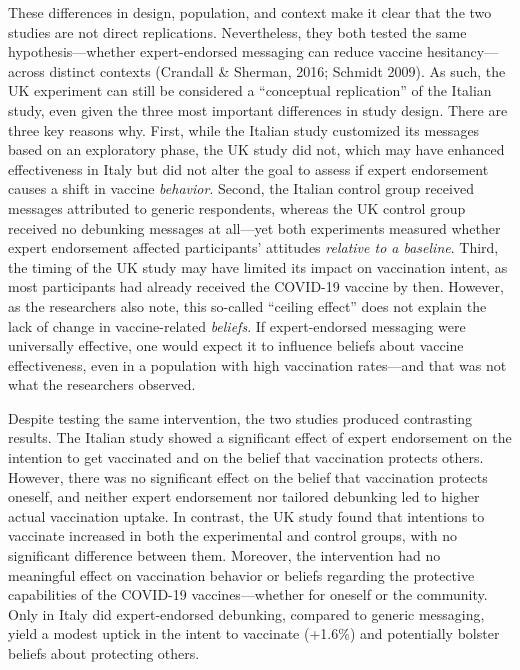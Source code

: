 \documentclass[authordate, reflection]{jote-new-article}
\begin{document}
	These differences in design, population, and context make it clear that the two studies are not direct replications. Nevertheless, they both tested the same hypothesis—whether expert-endorsed messaging can reduce vaccine hesitancy—across distinct contexts (Crandall \& Sherman, 2016; Schmidt 2009). As such, the UK experiment can still be considered a “conceptual replication” of the Italian study, even given the three most important differences in study design. There are three key reasons why. First, while the Italian study customized its messages based on an exploratory phase, the UK study did not, which may have enhanced effectiveness in Italy but did not alter the goal to assess if expert endorsement causes a shift in vaccine \emph{behavior}. Second, the Italian control group received messages attributed to generic respondents, whereas the UK control group received no debunking messages at all—yet both experiments measured whether expert endorsement affected participants' attitudes \emph{relative to a baseline}. Third, the timing of the UK study may have limited its impact on vaccination intent, as most participants had already received the COVID-19 vaccine by then. However, as the researchers also note, this so-called “ceiling effect” does not explain the lack of change in vaccine-related \emph{beliefs}. If expert-endorsed messaging were universally effective, one would expect it to influence beliefs about vaccine effectiveness, even in a population with high vaccination rates—and that was not what the researchers observed.







	Despite testing the same intervention, the two studies produced contrasting results. The Italian study showed a significant effect of expert endorsement on the intention to get vaccinated and on the belief that vaccination protects others. However, there was no significant effect on the belief that vaccination protects oneself, and neither expert endorsement nor tailored debunking led to higher actual vaccination uptake. In contrast, the UK study found that intentions to vaccinate increased in both the experimental and control groups, with no significant difference between them. Moreover, the intervention had no meaningful effect on vaccination behavior or beliefs regarding the protective capabilities of the COVID-19 vaccines—whether for oneself or the community. Only in Italy did expert-endorsed debunking, compared to generic messaging, yield a modest uptick in the intent to vaccinate (+1.6\%) and potentially bolster beliefs about protecting others.
\end{document}
